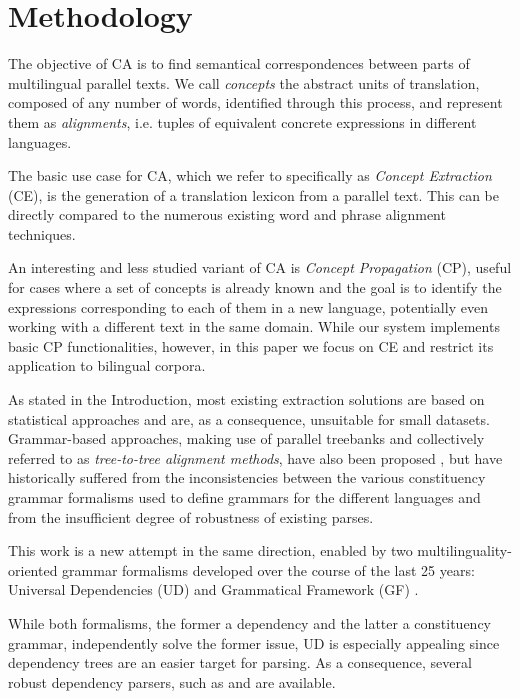 \documentclass[11pt]{article}
\begin{document}
\section{Methodology} \label{methodology}
The objective of CA is to find semantical correspondences between parts of multilingual parallel texts. 
We call \textit{concepts} the abstract units of translation, composed of any number of words, identified through this process, and represent them as \textit{alignments}, i.e. tuples of equivalent concrete expressions in different languages.

The basic use case for CA, which we refer to specifically as \textit{Concept Extraction} (CE), is the generation of a translation lexicon from a parallel text. This can be directly compared to the numerous existing word and phrase alignment techniques. 

An interesting and less studied variant of CA is \textit{Concept Propagation} (CP), useful for cases where a set of concepts is already known and the goal is to identify the expressions corresponding to each of them in a new language, potentially even working with a different text in the same domain.
While our system implements basic CP functionalities, however, in this paper we focus on CE and restrict its application to bilingual corpora. 

As stated in the Introduction, most existing extraction solutions are based on statistical approaches and are, as a consequence, unsuitable for small datasets. 
Grammar-based approaches, making use of parallel treebanks and collectively referred to as \textit{tree-to-tree alignment methods}, have also been proposed \cite{TODO:}, but have historically suffered from the inconsistencies between the various constituency grammar formalisms used to define grammars for the different languages and from the insufficient degree of robustness of existing parses.

This work is a new attempt in the same direction, enabled by two multilinguality-oriented grammar formalisms developed over the course of the last 25 years: Universal Dependencies (UD) \cite{TODO:} and Grammatical Framework (GF) \cite{TODO:}.

While both formalisms, the former a dependency and the latter a constituency grammar, independently solve the former issue, UD is especially appealing since dependency trees are an easier target for parsing. 
As a consequence, several robust dependency parsers, such as \cite{TODO: UDPipe} and \cite{TODO: Standford} are available.
\end{document}
